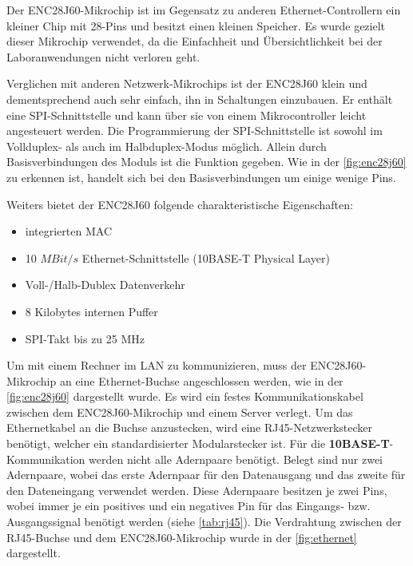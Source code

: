 Der ENC28J60-Mikrochip ist im Gegensatz zu anderen Ethernet-Controllern ein kleiner Chip mit 28-Pins und besitzt einen kleinen Speicher. Es wurde gezielt dieser Mikrochip verwendet, da die Einfachheit und Übersichtlichkeit bei der Laboranwendungen nicht verloren geht. \smallskip \smallskip %

Verglichen mit anderen Netzwerk-Mikrochips ist der ENC28J60 klein und dementsprechend auch sehr einfach, ihn in Schaltungen einzubauen. Er enthält eine SPI-Schnittstelle und kann über sie von einem Mikrocontroller leicht angesteuert werden. Die Programmierung der SPI-Schnittstelle ist sowohl im Vollduplex- als auch im Halbduplex-Modus möglich. Allein durch Basisverbindungen des Moduls ist die Funktion gegeben. Wie in der \autoref{fig:enc28j60} zu erkennen ist, handelt sich bei den Basisverbindungen um einige wenige Pins. \smallskip \smallskip

Weiters bietet der ENC28J60 folgende charakteristische Eigenschaften:

\begin{itemize}
	\item integrierten MAC
	\item 10 $MBit/s$ Ethernet-Schnittstelle (10BASE-T Physical Layer)
	\item Voll-/Halb-Dublex Datenverkehr
	\item 8 Kilobytes internen Puffer
	\item SPI-Takt bis zu 25 MHz
\end{itemize}

Um mit einem Rechner im LAN zu kommunizieren, muss der ENC28J60-Mikrochip an eine Ethernet-Buchse angeschlossen werden, wie in der \autoref{fig:enc28j60} dargestellt wurde. Es wird ein festes Kommunikationskabel zwischen dem ENC28J60-Mikrochip und einem Server verlegt. Um das Ethernetkabel an die Buchse anzustecken, wird eine RJ45-Netzwerkstecker benötigt, welcher ein standardisierter Modularstecker ist. Für die \textbf{10BASE-T}-Kommunikation werden nicht alle Adernpaare benötigt. Belegt sind nur zwei Adernpaare, wobei das erste Adernpaar für den Datenausgang und das zweite für den Dateneingang verwendet werden. Diese Adernpaare besitzen je zwei Pins, wobei immer je ein positives und ein negatives Pin für das Eingangs- bzw. Ausgangssignal benötigt werden (siehe \autoref{tab:rj45}). Die Verdrahtung zwischen der RJ45-Buchse und dem ENC28J60-Mikrochip wurde in der \autoref{fig:ethernet} dargestellt. \smallskip \smallskip

